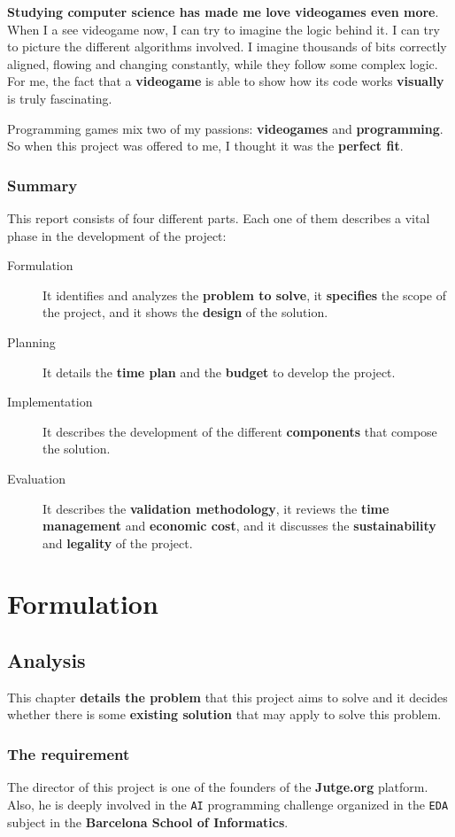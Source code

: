 \documentclass[a4paper,11pt,titlepage,abstract,numbers=noenddot,automark,mnsy,intlimits,rgb,dvipsnames]{report}
\begin{document}
\textbf{Studying computer science has made me love videogames even more}. When I a see videogame now, I can try to
imagine the logic
behind it. I can try to picture the different algorithms involved. I imagine thousands of bits correctly aligned,
flowing and changing constantly, while they follow some complex logic. For me, the fact that a \textbf{videogame} is
able to show how its code works \textbf{visually} is truly fascinating.

Programming games mix two of my passions: \textbf{videogames} and \textbf{programming}. So when this project was offered to me,
I thought it was the \textbf{perfect fit}.
\section{Summary}
This report consists of four different parts. Each one of them describes a vital phase in the development of
the project:
\begin{description}
\item[Formulation]
It identifies and analyzes the \textbf{problem to solve}, it \textbf{specifies} the scope of
  the project, and it shows the \textbf{design} of the solution.
\item[Planning]
It details the \textbf{time plan} and the \textbf{budget} to develop the project.
\item[Implementation]
It describes the development of the different \textbf{components} that compose the solution.
\item[Evaluation]
It describes the \textbf{validation methodology}, it reviews the \textbf{time management} and \textbf{economic cost},
  and it discusses the \textbf{sustainability} and \textbf{legality} of the project.
\end{description}
\part{Formulation}
\chapter{Analysis}
This chapter \textbf{details the problem} that this project aims to solve and it decides whether there is some \textbf{existing
solution} that may apply to solve this problem.
\section{The requirement}
\label{requirement}
The director of this project is one of the founders of the \textbf{Jutge.org} platform. Also, he is deeply involved in the \texttt{AI}
programming challenge organized in the \texttt{EDA} subject in the \textbf{Barcelona School of Informatics}.
\end{document}
